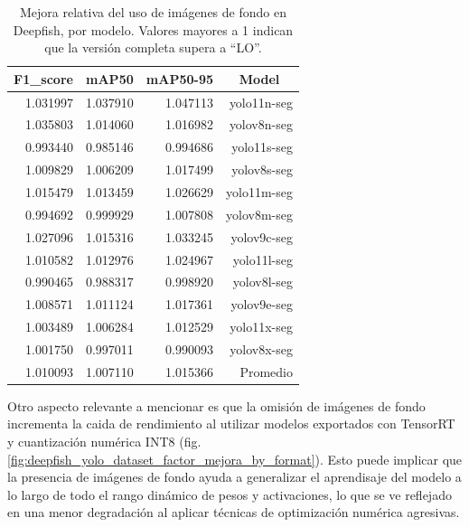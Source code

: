 \begin{table}[htbp]
\centering
\caption[Mejora relativa del uso de imágenes de fondo en Deepfish, por modelo]{Mejora relativa del uso de imágenes de fondo en Deepfish, por modelo. Valores mayores a 1 indican que la versión completa supera a ``LO''.}
\label{tab:deepfish_mejoraRelativa_model}
\begin{tabular}{|r|r|r|r|}
\hline
\multicolumn{1}{|c|}{\textbf{F1\_score}} & \multicolumn{1}{c|}{\textbf{mAP50}} & \multicolumn{1}{c|}{\textbf{mAP50-95}} & \multicolumn{1}{c|}{\textbf{Model}} \\ \hline
1.031997 & 1.037910 & 1.047113 & yolo11n-seg \\ \hline
1.035803 & 1.014060 & 1.016982 & yolov8n-seg \\ \hline
0.993440 & 0.985146 & 0.994686 & yolo11s-seg \\ \hline
1.009829 & 1.006209 & 1.017499 & yolov8s-seg \\ \hline
1.015479 & 1.013459 & 1.026629 & yolo11m-seg \\ \hline
0.994692 & 0.999929 & 1.007808 & yolov8m-seg \\ \hline
1.027096 & 1.015316 & 1.033245 & yolov9c-seg \\ \hline
1.010582 & 1.012976 & 1.024967 & yolo11l-seg \\ \hline
0.990465 & 0.988317 & 0.998920 & yolov8l-seg \\ \hline
1.008571 & 1.011124 & 1.017361 & yolov9e-seg \\ \hline
1.003489 & 1.006284 & 1.012529 & yolo11x-seg \\ \hline
1.001750 & 0.997011 & 0.990093 & yolov8x-seg \\ \hline
1.010093 & 1.007110 & 1.015366 & Promedio \\ \hline
\end{tabular}
\end{table}

Otro aspecto relevante a mencionar es que la omisión de imágenes de fondo incrementa la caida de rendimiento al utilizar modelos exportados con TensorRT y cuantización numérica INT8 (fig. \ref{fig:deepfish_yolo_dataset_factor_mejora_by_format}). Esto puede implicar que la presencia de imágenes de fondo ayuda a generalizar el aprendisaje del modelo a lo largo de todo el rango dinámico de pesos y activaciones, lo que se ve reflejado en una menor degradación al aplicar técnicas de optimización numérica agresivas.

